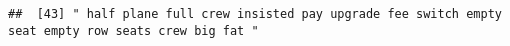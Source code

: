 \documentclass[
]{article}
\begin{document}
\begin{verbatim}
##  [43] " half plane full crew insisted pay upgrade fee switch empty seat empty row seats crew big fat "                                                                                                                                                                                                                                                                                                                                                                                                                                                                                                                                                                                                                                                                                                                                                                                                                                                                                                                                                                                                                                                                                                                                                                                                                                                                                                                                                                                                                                                                                                                                                                                                                                                                                                

\end{verbatim}
\end{document}
